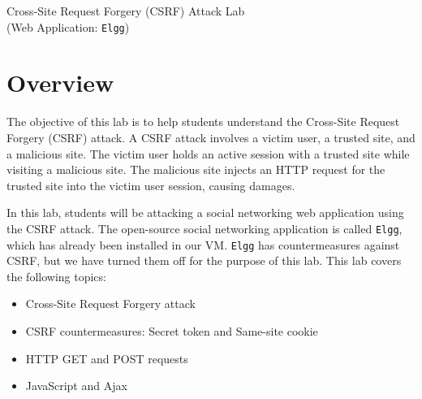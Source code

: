 







\begin{center}
{\LARGE Cross-Site Request Forgery (CSRF) Attack Lab}
\vspace{0.1in}\\
{\Large (Web Application: {\tt Elgg})}
\end{center}




\section{Overview}


The objective of this lab is to help students understand the Cross-Site Request
Forgery (CSRF) attack. A CSRF attack involves a victim user, a
trusted site, and a malicious site. The victim user holds an active session
with a trusted site while visiting a malicious site. The
malicious site injects an HTTP request for the trusted site into the victim
user session, causing damages.

In this lab, students  will be attacking a social networking web
application using the CSRF attack. The open-source social networking application is called 
\texttt{Elgg}, which has already been installed in our VM.
\texttt{Elgg} has countermeasures against CSRF, but we have turned them off for the
purpose of this lab.  This lab covers the following topics:

\begin{itemize}[noitemsep]
 \item Cross-Site Request Forgery attack
 \item CSRF countermeasures: Secret token and Same-site cookie
 \item HTTP GET and POST requests
 \item JavaScript and Ajax
\end{itemize}


